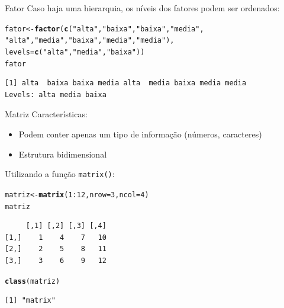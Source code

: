 \documentclass[10pt,handout]{beamer}\usepackage[]{graphicx}\usepackage[]{color}
\makeatletter
\newcommand{\hlnum}[1]{\textcolor[rgb]{0.686,0.059,0.569}{#1}}%
\newcommand{\hlstr}[1]{\textcolor[rgb]{0.192,0.494,0.8}{#1}}%
\newcommand{\hlopt}[1]{\textcolor[rgb]{0,0,0}{#1}}%
\newcommand{\hlstd}[1]{\textcolor[rgb]{0.345,0.345,0.345}{#1}}%
\newcommand{\hlkwb}[1]{\textcolor[rgb]{0.69,0.353,0.396}{#1}}%
\newcommand{\hlkwc}[1]{\textcolor[rgb]{0.333,0.667,0.333}{#1}}%
\newcommand{\hlkwd}[1]{\textcolor[rgb]{0.737,0.353,0.396}{\textbf{#1}}}%
\newenvironment{kframe}{%
 \def\at@end@of@kframe{}%
 \ifinner\ifhmode%
  \def\at@end@of@kframe{\end{minipage}}%
  \begin{minipage}{\columnwidth}%
 \fi\fi%
 \def\FrameCommand##1{\hskip\@totalleftmargin \hskip-\fboxsep
 \colorbox{shadecolor}{##1}\hskip-\fboxsep
     \hskip-\linewidth \hskip-\@totalleftmargin \hskip\columnwidth}%
 \MakeFramed {\advance\hsize-\width
   \@totalleftmargin\z@ \linewidth\hsize
   \@setminipage}}%
 {\par\unskip\endMakeFramed%
 \at@end@of@kframe}
\newenvironment{knitrout}{}{} %
\makeatother
\begin{document}
\begin{frame}[fragile]{Fator}
Caso haja uma hierarquia, os níveis dos fatores podem ser ordenados:
\begin{knitrout}\small
{}\color{fgcolor}\begin{kframe}
\begin{alltt}
\hlstd{fator} \hlkwb{<-} \hlkwd{factor}\hlstd{(}\hlkwd{c}\hlstd{(}\hlstr{"alta"}\hlstd{,}\hlstr{"baixa"}\hlstd{,}\hlstr{"baixa"}\hlstd{,}\hlstr{"media"}\hlstd{,}
                  \hlstr{"alta"}\hlstd{,}\hlstr{"media"}\hlstd{,}\hlstr{"baixa"}\hlstd{,}\hlstr{"media"}\hlstd{,}\hlstr{"media"}\hlstd{),}
                \hlkwc{levels} \hlstd{=} \hlkwd{c}\hlstd{(}\hlstr{"alta"}\hlstd{,}\hlstr{"media"}\hlstd{,}\hlstr{"baixa"}\hlstd{))}
\hlstd{fator}
\end{alltt}
\begin{verbatim}
[1] alta  baixa baixa media alta  media baixa media media
Levels: alta media baixa
\end{verbatim}
\end{kframe}
\end{knitrout}
\end{frame}


\begin{frame}[fragile]{Matriz}
Características:
\begin{itemize}
\item Podem conter apenas um tipo de informação (números, caracteres)
\item Estrutura bidimensional
\end{itemize}
Utilizando a função \texttt{matrix()}:
\begin{knitrout}\small
{}\color{fgcolor}\begin{kframe}
\begin{alltt}
\hlstd{matriz} \hlkwb{<-} \hlkwd{matrix}\hlstd{(}\hlnum{1}\hlopt{:}\hlnum{12}\hlstd{,} \hlkwc{nrow} \hlstd{=} \hlnum{3}\hlstd{,} \hlkwc{ncol} \hlstd{=} \hlnum{4}\hlstd{)}
\hlstd{matriz}
\end{alltt}
\begin{verbatim}
     [,1] [,2] [,3] [,4]
[1,]    1    4    7   10
[2,]    2    5    8   11
[3,]    3    6    9   12
\end{verbatim}
\begin{alltt}
\hlkwd{class}\hlstd{(matriz)}
\end{alltt}
\begin{verbatim}
[1] "matrix"
\end{verbatim}
\end{kframe}
\end{knitrout}
\end{frame}
\end{document}
